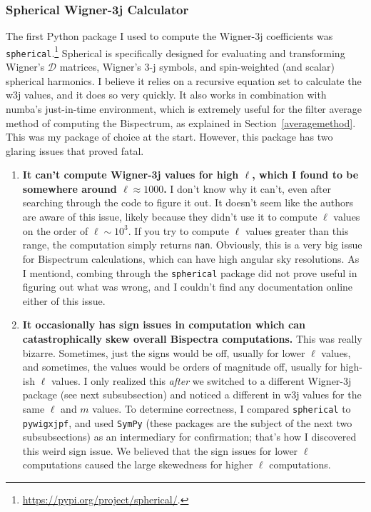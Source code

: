 \documentclass[11pt]{article}
\renewcommand{\_}[1]{\underline{ #1 }}
\newcommand{\npar}{\vspace{.3cm}\newline}
\begin{document}
{\subsubsection{Spherical Wigner-3j Calculator}

The first Python package I used to compute the Wigner-3j coefficients was \texttt{spherical}.\footnote{\href{https://pypi.org/project/spherical/}{https://pypi.org/project/spherical/}.} Spherical is specifically designed for evaluating and transforming Wigner's $\mathcal{D}$ matrices, Wigner's 3-j symbols, and spin-weighted (and scalar) spherical harmonics. I believe it relies on a recursive equation set to calculate the w3j values, and it does so very quickly. It also works in combination with numba's just-in-time environment, which is extremely useful for the filter average method of computing the Bispectrum, as explained in Section~\ref{averagemethod}.
\npar
This was my package of choice at the start. However, this package has two glaring issues that proved fatal.

\begin{enumerate}
    \item \textbf{It can't compute Wigner-3j values for high $\ell$, which I found to be somewhere around $\ell \approx 1000$.} I don't know why it can't, even after searching through the code to figure it out. It doesn't seem like the authors are aware of this issue, likely because they didn't use it to compute $\ell$ values on the order of $\ell \sim 10^3$. If you try to compute $\ell$ values greater than this range, the computation simply returns \texttt{nan}. Obviously, this is a very big issue for Bispectrum calculations, which can have high angular sky resolutions. As I mentiond, combing through the \texttt{spherical} package did not prove useful in figuring out what was wrong, and I couldn't find any documentation online either of this issue.
    \item \textbf{It occasionally has sign issues in computation which can catastrophically skew overall Bispectra computations.} This was really bizarre. Sometimes, just the signs would be off, usually for lower $\ell$ values, and sometimes, the values would be orders of magnitude off, usually for high-ish $\ell$ values. I only realized this \textit{after} we switched to a different Wigner-3j package (see next subsubsection) and noticed a different in w3j values for the same $\ell$ and $m$ values. To determine correctness, I compared \texttt{spherical} to \texttt{pywigxjpf}, and used \texttt{SymPy} (these packages are the subject of the next two subsubsections) as an intermediary for confirmation; that's how I discovered this weird sign issue. We believed that the sign issues for lower $\ell$ computations caused the large skewedness for higher $\ell$ computations.
\end{enumerate}

}
\end{document}

